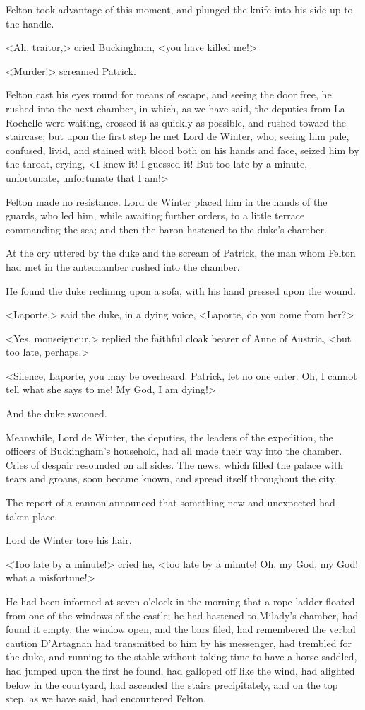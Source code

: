 Felton took advantage of this moment, and plunged the knife into his side up to the handle. 

<Ah, traitor,> cried Buckingham, <you have killed me!> 

<Murder!> screamed Patrick. 

Felton cast his eyes round for means of escape, and seeing the door free, he rushed into the next chamber, in which, as we have said, the deputies from La Rochelle were waiting, crossed it as quickly as possible, and rushed toward the staircase; but upon the first step he met Lord de Winter, who, seeing him pale, confused, livid, and stained with blood both on his hands and face, seized him by the throat, crying, <I knew it! I guessed it! But too late by a minute, unfortunate, unfortunate that I am!> 

Felton made no resistance. Lord de Winter placed him in the hands of the guards, who led him, while awaiting further orders, to a little terrace commanding the sea; and then the baron hastened to the duke's chamber. 

At the cry uttered by the duke and the scream of Patrick, the man whom Felton had met in the antechamber rushed into the chamber. 

He found the duke reclining upon a sofa, with his hand pressed upon the wound. 

<Laporte,> said the duke, in a dying voice, <Laporte, do you come from her?> 

<Yes, monseigneur,> replied the faithful cloak bearer of Anne of Austria, <but too late, perhaps.> 

<Silence, Laporte, you may be overheard. Patrick, let no one enter. Oh, I cannot tell what she says to me! My God, I am dying!> 

And the duke swooned. 

Meanwhile, Lord de Winter, the deputies, the leaders of the expedition, the officers of Buckingham's household, had all made their way into the chamber. Cries of despair resounded on all sides. The news, which filled the palace with tears and groans, soon became known, and spread itself throughout the city. 

The report of a cannon announced that something new and unexpected had taken place. 

Lord de Winter tore his hair. 

<Too late by a minute!> cried he, <too late by a minute! Oh, my God, my God! what a misfortune!> 

He had been informed at seven o'clock in the morning that a rope ladder floated from one of the windows of the castle; he had hastened to Milady's chamber, had found it empty, the window open, and the bars filed, had remembered the verbal caution D'Artagnan had transmitted to him by his messenger, had trembled for the duke, and running to the stable without taking time to have a horse saddled, had jumped upon the first he found, had galloped off like the wind, had alighted below in the courtyard, had ascended the stairs precipitately, and on the top step, as we have said, had encountered Felton. 

